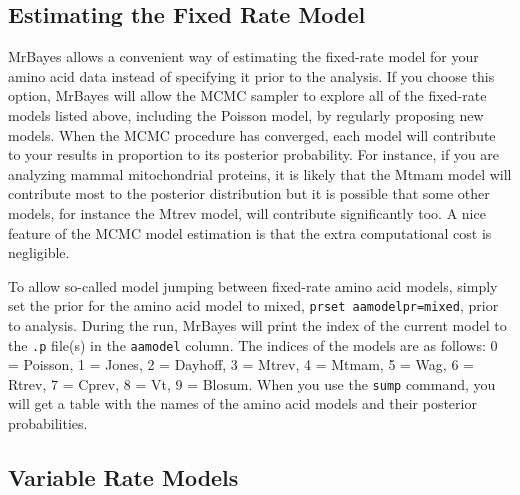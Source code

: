 \documentclass[12pt]{book}
\begin{document}
\subsection{Estimating the Fixed Rate Model}
\label{estimatingTheFixedRateModel}

MrBayes allows a convenient way of estimating the fixed-rate model for your amino acid data instead
of specifying it prior to the analysis. If you choose this option, MrBayes will allow the MCMC
sampler to explore all of the fixed-rate models listed above, including the Poisson model, by
regularly proposing new models. When the MCMC procedure has converged, each model will contribute
to your results in proportion to its posterior probability. For instance, if you are analyzing
mammal mitochondrial proteins, it is likely that the Mtmam model will contribute most to the
posterior distribution but it is possible that some other models, for instance the Mtrev model,
will contribute significantly too. A nice feature of the MCMC model estimation is that the extra
computational cost is negligible.

To allow so-called model jumping between fixed-rate amino acid models, simply set the prior for the
amino acid model to mixed, \texttt{prset aamodelpr=mixed}, prior to analysis. During the run,
MrBayes will print the index of the current model to the \texttt{.p} file(s) in the
\texttt{aamodel} column. The indices of the models are as follows: 0 = Poisson, 1 = Jones, 2 =
Dayhoff, 3 = Mtrev, 4 = Mtmam, 5 = Wag, 6 = Rtrev, 7 = Cprev, 8 = Vt, 9 = Blosum. When you use the
\texttt{sump} command, you will get a table with the names of the amino acid models and their
posterior probabilities.

\subsection{Variable Rate Models}
\end{document}
